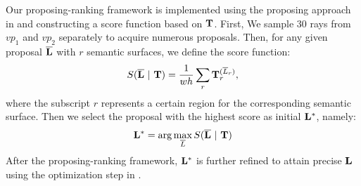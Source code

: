Our proposing-ranking framework is implemented using the proposing approach in \cite{hedau2009recovering} and constructing a score function based on $\mathbf{T}$. First, We sample 30 rays from $vp_1$ and $vp_2$ separately to acquire numerous proposals. Then, for any given proposal $\mathbf{\overline{L}}$ with $r$ semantic surfaces, we define the score function:
%
\begin{equation}
\label{eq:scorefunction}
S(\mathbf{\overline{L}}~|~\mathbf{T}) = \frac{1}{wh}\sum_r \mathbf{T}_r^{(\overline{L}_r)},
\end{equation}
%
where the subscript $r$ represents a certain region for the corresponding semantic surface. Then we select the proposal with the highest score as initial $\mathbf{L^*}$, namely:
%
\begin{equation}
\label{eq:initial}
\mathbf{L^*} = \arg\max_{\overline{L}} S(\mathbf{\overline{L}}~|~\mathbf{T})
\end{equation}
%
After the proposing-ranking framework, $\mathbf{L^*}$ is further refined to attain precise $\mathbf{L}$ using the optimization step in \cite{dasgupta2016delay}.


